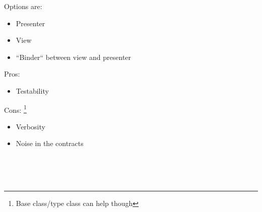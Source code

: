 \documentclass[10pt]{beamer}
\begin{document}
\begin{frame}[fragile]
Options are:
\begin{itemize}
\item Presenter
\item View 
\item ``Binder`` between view and presenter
\end{itemize}
\end{frame}

\begin{frame}[fragile]
Pros:
\begin{itemize}
\item Testability 
\end{itemize}
Cons:%
\footnote{Base class/type class can help though}
\begin{itemize}
\item Verbosity
\item Noise in the contracts 
\end{itemize}
\end{frame}

\begin{frame}[fragile]
\begin{lstlisting}[language=Kotlin, basicstyle=\ttfamily]
\end{lstlisting}
\end{frame}


\begin{frame}[fragile]
\begin{lstlisting}[language=Kotlin, basicstyle=\ttfamily]
\end{lstlisting}
\end{frame}


\begin{frame}[fragile]
\begin{lstlisting}[language=Kotlin, basicstyle=\ttfamily]
\end{lstlisting}
\end{frame}



\begin{frame}[fragile]
\begin{lstlisting}[language=Kotlin, basicstyle=\ttfamily]
\end{lstlisting}
\end{frame}

\begin{frame}[fragile]
\begin{lstlisting}[language=Kotlin, basicstyle=\ttfamily]
\end{lstlisting}
\end{frame}
\end{document}
